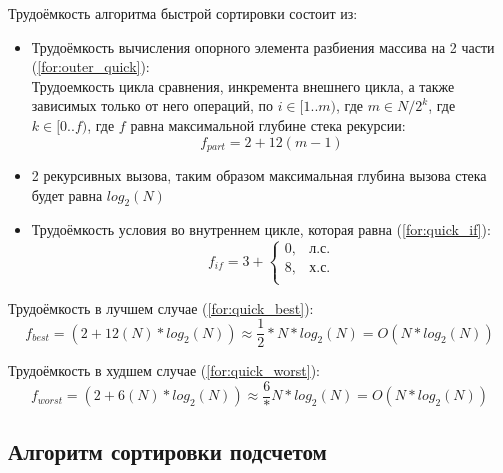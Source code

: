 Трудоёмкость алгоритма быстрой сортировки состоит из:
\begin{itemize}
	\item Трудоёмкость вычисления опорного элемента разбиения массива на 2 части (\ref{for:outer_quick}):\\
	Трудоемкость цикла сравнения, инкремента внешнего цикла, а также зависимых только от него операций, по $i \in [1..m)$, где $m \in N/2^k$, где $k \in [0..f)$, где $f$ равна максимальной глубине стека рекурсии:
	\begin{equation}
		\label{for:outer_quick}
		f_{part} = 2 + 12(m - 1)
	\end{equation}
	\item 2 рекурсивных вызова, таким образом максимальная глубина вызова стека будет равна $log_2(N)$
	\item Трудоёмкость условия во внутреннем цикле, которая равна (\ref{for:quick_if}):
	\begin{equation}
		\label{for:quick_if}
		f_{if} = 3 + \begin{cases}
			0, & \text{л.с.}\\
			8, & \text{х.с.}\\
		\end{cases}
	\end{equation}
\end{itemize}

Трудоёмкость в лучшем случае (\ref{for:quick_best}):
\begin{equation}
	\label{for:quick_best}
	f_{best} = (2 + 12(N) * log_2(N)) \approx \frac 12 * N * log_2(N) = O(N*log_2(N))
\end{equation}

Трудоёмкость в худшем случае (\ref{for:quick_worst}):
\begin{equation}
	\label{for:quick_worst}
	f_{worst} = (2 + 6(N) * log_2(N)) \approx \frac 6 * N * log_2(N) = O(N*log_2(N))
\end{equation}





\subsection{Алгоритм сортировки подсчетом}

